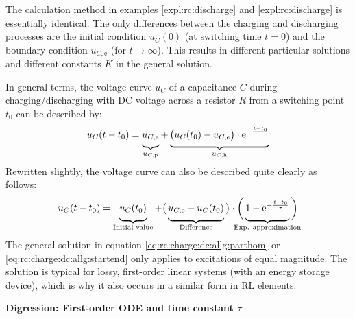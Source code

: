 \begin{frame}[t]
{    The calculation method in examples \ref{expl:rc:discharge} and \ref{expl:rc:discharge} is essentially identical.
    The only differences between the charging and discharging processes are the initial condition $u_C(0)$ (at switching time $t=0$) and the boundary condition $u_{C,\mathrm{e}}$ (for $t \to \infty$).
    This results in different particular solutions and different constants $K$ in the general solution.

    In general terms, the voltage curve $u_C$ of a capacitance $C$ during charging/discharging with DC voltage across a resistor $R$
    from a switching point $t_0$ can be described by:    
    \begin{equation}\label{eq:rc:charge:dc:allg:parthom}
        u_C(t-t_0) = \underbrace{ u_{C,\mathrm{e}} \vphantom{\Big|}}_{u_{C,\mathrm{p}}} + \underbrace{ \big(u_C(t_0)-u_{C,\mathrm e}\big) \cdot  \mathrm{e}^{-\frac{t-t_0}{\tau}} \vphantom{\Big|}}_{u_{C,\mathrm{h}}}
    \end{equation}
    Rewritten slightly, the voltage curve can also be described quite clearly as follows:
    \begin{equation}\label{eq:rc:charge:dc:allg:startend}
        u_C(t-t_0) = \underbrace{u_C(t_0) \vphantom{\Big|}}_{\text{Initial value}} + \big(\underbrace{u_{C,\mathrm e} - u_C(t_0) \vphantom{\Big|}}_{\text{Difference}}\big) \cdot \bigg( \underbrace{ 1- \mathrm{e}^{-\frac{t-t_0}{\tau}} \vphantom{\Big|}}_{\text{\clap{Exp. approximation}}} \bigg)
    \end{equation}
    The general solution in equation \ref{eq:rc:charge:dc:allg:parthom} or \ref{eq:rc:charge:dc:allg:startend} only applies to excitations of equal magnitude.
    The solution is typical for lossy, first-order linear systems (with an energy storage device), which is why it also occurs in a similar form in RL elements.

    \textbf{Digression: First-order ODE and time constant $\tau$}

}
\end{frame}
